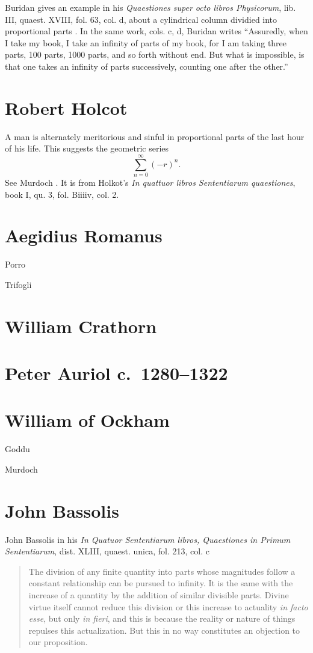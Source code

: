 \documentclass{amsart}
\theoremstyle{definition}
\begin{document}
Buridan gives an example in his {\em Quaestiones super octo libros Physicorum}, lib. III, quaest. XVIII, fol. 63, col. d, about a cylindrical column dividied into proportional parts \cite[p.~58]{ariew}. In the same work, cols. c, d, Buridan writes ``Assuredly, when I take my book, I take an infinity of parts of my book, for I am taking three parts, 100 parts, 1000 parts, and so forth without end.
But what is impossible, is that one takes an infinity of parts successively, counting one after the other.''



\section{Robert Holcot}
A man is alternately meritorious and sinful in proportional parts of the last hour of his life. This suggests the geometric series
\[
\sum_{n=0}^\infty (-r)^n.
\]
See Murdoch \cite[p.~327]{murdoch1975}. It is from Holkot's {\em In quattuor libros
Sententiarum quaestiones}, book I, qu. 3, fol. Biiiiv, col. 2.


\section{Aegidius Romanus}
Porro \cite{porro}

Trifogli \cite{trifogli1993}

\section{William Crathorn}

\section{Peter Auriol c.~1280--1322}


\section{William of Ockham}
Goddu \cite{goddu}

Murdoch \cite{murdoch1982}

\section{John Bassolis}
John Bassolis in his {\em In Quatuor Sententiarum libros, Quaestiones in Primum Sententiarum}, dist. XLIII, quaest. unica, fol. 213, col. c \cite[p.~99]{ariew}
\begin{quote}
The division of any finite quantity into parts whose magnitudes follow a constant relationship can be pursued to infinity. It is the same with the increase of a quantity by the addition
of similar divisible parts. Divine virtue itself cannot reduce this division or this increase to actuality {\em in facto esse}, but only {\em in fieri}, and this is because the reality
or nature of things repulses this actualization. But this in no way constitutes an objection to our proposition.
\end{quote}
\end{document}
